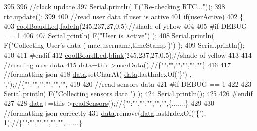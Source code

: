 \begin{DoxyCode}
395 
396     \textcolor{comment}{//clock update}
397     Serial.println( F(\textcolor{stringliteral}{"Re-checking RTC..."}));
398     \hyperlink{class_cool_board_a50d2a6716879d64a85f3c6b44ad63275}{rtc}.\hyperlink{class_cool_time_aae601f795452cfa48d9fb337aed483a8}{update}();
399 
400     \textcolor{comment}{//read user data if user is active}
401     \textcolor{keywordflow}{if}(\hyperlink{class_cool_board_a6395459131d6889a3005f79c7a35e964}{userActive})
402     \{
403         \hyperlink{class_cool_board_a1b1d3c684a5baa56b08486e192fd8e97}{coolBoardLed}.\hyperlink{class_cool_board_led_ab778f5e7bed0ab74e3906d82110493c3}{fadeIn}(245,237,27,0.5);\textcolor{comment}{//shade of yellow}
404     
405 \textcolor{preprocessor}{    #if DEBUG == 1}
406 
407         Serial.println( F(\textcolor{stringliteral}{"User is Active"}) );
408         Serial.println( F(\textcolor{stringliteral}{"Collecting User's data ( mac,username,timeStamp )"}) );
409         Serial.println();
410     
411 \textcolor{preprocessor}{    #endif  }
412         \hyperlink{class_cool_board_a1b1d3c684a5baa56b08486e192fd8e97}{coolBoardLed}.\hyperlink{class_cool_board_led_a96e1ea13003eee34c9dbcef340404426}{blink}(245,237,27,0.5);\textcolor{comment}{//shade of yellow   }
413 
414         \textcolor{comment}{//reading user data}
415         \hyperlink{class_cool_board_a427fb753dd8575bdf821c70a5c63d695}{data}=this->\hyperlink{class_cool_board_ae7358fb6e623cfc81b775f5f1734909b}{userData}();\textcolor{comment}{//\{"":"","":"","",""\}}
416 
417         \textcolor{comment}{//formatting json }
418         \hyperlink{class_cool_board_a427fb753dd8575bdf821c70a5c63d695}{data}.setCharAt( \hyperlink{class_cool_board_a427fb753dd8575bdf821c70a5c63d695}{data}.lastIndexOf(\textcolor{charliteral}{'\}'}) , \textcolor{charliteral}{','});\textcolor{comment}{//\{"":"","":"","","",}
419                 
420         \textcolor{comment}{//read sensors data}
421 \textcolor{preprocessor}{    #if DEBUG == 1}
422 
423         Serial.println( F(\textcolor{stringliteral}{"Collecting sensors data "}) );
424         Serial.println();
425     
426 \textcolor{preprocessor}{    #endif}
427 
428         \hyperlink{class_cool_board_a427fb753dd8575bdf821c70a5c63d695}{data}+=this->\hyperlink{class_cool_board_ad03abdce2e65f520bbf2cff0f2d083cf}{readSensors}();\textcolor{comment}{//\{"":"","":"","","",\{.......\}     }
429 
430         \textcolor{comment}{//formatting json correctly}
431         \hyperlink{class_cool_board_a427fb753dd8575bdf821c70a5c63d695}{data}.remove(\hyperlink{class_cool_board_a427fb753dd8575bdf821c70a5c63d695}{data}.lastIndexOf(\textcolor{charliteral}{'\{'}), 1);\textcolor{comment}{//\{"":"","":"","","",.......\}}

\end{DoxyCode}
